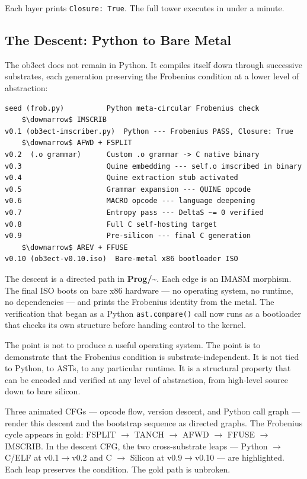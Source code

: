 \documentclass[12pt,a4paper]{article}
\begin{document}
Each layer prints \texttt{Closure: True}. The full tower executes in under a minute.

\subsection{The Descent: Python to Bare Metal}

The ob3ect does not remain in Python. It compiles itself down through successive substrates, each generation preserving the Frobenius condition at a lower level of abstraction:

\begin{lstlisting}
seed (frob.py)          Python meta-circular Frobenius check
    $\downarrow$ IMSCRIB
v0.1 (ob3ect-imscriber.py)  Python --- Frobenius PASS, Closure: True
    $\downarrow$ AFWD + FSPLIT
v0.2  (.o grammar)      Custom .o grammar -> C native binary
v0.3                    Quine embedding --- self.o imscribed in binary
v0.4                    Quine extraction stub activated
v0.5                    Grammar expansion --- QUINE opcode
v0.6                    MACRO opcode --- language deepening
v0.7                    Entropy pass --- DeltaS ~= 0 verified
v0.8                    Full C self-hosting target
v0.9                    Pre-silicon --- final C generation
    $\downarrow$ AREV + FFUSE
v0.10 (ob3ect-v0.10.iso)  Bare-metal x86 bootloader ISO
\end{lstlisting}

The descent is a directed path in \textbf{Prog/\textasciitilde{}}. Each edge is an IMASM morphism. The final ISO boots on bare x86 hardware --- no operating system, no runtime, no dependencies --- and prints the Frobenius identity from the metal. The verification that began as a Python \texttt{ast.compare()} call now runs as a bootloader that checks its own structure before handing control to the kernel.

The point is not to produce a useful operating system. The point is to demonstrate that the Frobenius condition is substrate-independent. It is not tied to Python, to ASTs, to any particular runtime. It is a structural property that can be encoded and verified at any level of abstraction, from high-level source down to bare silicon.

Three animated CFGs --- opcode flow, version descent, and Python call graph --- render this descent and the bootstrap sequence as directed graphs. The Frobenius cycle appears in gold: FSPLIT $\rightarrow$ TANCH $\rightarrow$ AFWD $\rightarrow$ FFUSE $\rightarrow$ IMSCRIB. In the descent CFG, the two cross-substrate leaps --- Python $\rightarrow$ C/ELF at v0.1$\rightarrow$v0.2 and C $\rightarrow$ Silicon at v0.9$\rightarrow$v0.10 --- are highlighted. Each leap preserves the condition. The gold path is unbroken.
\end{document}
